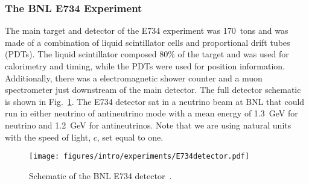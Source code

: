   \subsubsection{The BNL E734 Experiment}\label{sec:e734}
  The main target and detector of the E734 experiment was 170~tons and was made
  of a combination of liquid scintillator cells and proportional drift tubes
  (PDTs). The liquid scintillator composed 80\% of the target and was used for
  calorimetry and timing, while the PDTs were used for position information.
  Additionally, there was a electromagnetic shower counter and a muon
  spectrometer just downstream of the main detector. The full detector
  schematic is shown in Fig.~\ref{fig:e734detector}.  The E734 detector sat in
  a neutrino beam at BNL that could run in either neutrino of antineutrino mode
  with a mean energy of 1.3~GeV for neutrino and 1.2~GeV for antineutrinos.
  Note that we are using natural units with the speed of light, $c$, set equal
  to one.
  \begin{figure}[h]
    \centering
    \texttt{[image: figures/intro/experiments/E734detector.pdf]}
    \caption{Schematic of the BNL E734 detector~\cite{Ahrens:1986xe}.}
    \label{fig:e734detector}
  \end{figure}

